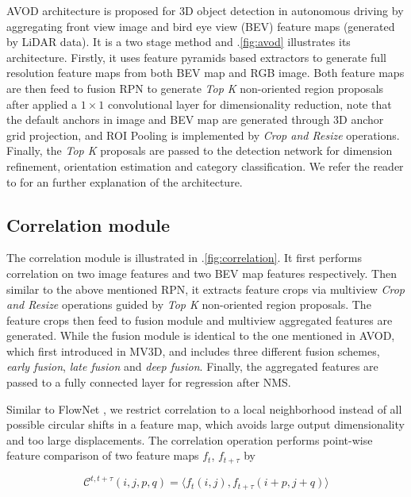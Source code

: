 \documentclass{bmvc2k}
\begin{document}
AVOD architecture is proposed for 3D object detection in autonomous driving by aggregating front view image and bird eye view (BEV) feature maps (generated by LiDAR data). It is a two stage method and \figurename .\ref{fig:avod} illustrates its architecture. Firstly, it uses feature pyramids based extractors to generate full resolution feature maps from both BEV map and RGB image. Both feature maps are then feed to fusion RPN to generate \textit{Top K} non-oriented region proposals after applied a $1 \times 1$ convolutional layer for dimensionality reduction, note that the default anchors in image and BEV map are generated through 3D anchor grid projection, and ROI Pooling is implemented by \textit{Crop and Resize} operations. Finally, the \textit{Top K} proposals are passed to the detection network for dimension refinement, orientation estimation and category classification. We refer
the reader to \cite{ku2018joint} for an further explanation of the architecture.

\subsection{Correlation module}
The correlation module is illustrated in \figurename .\ref{fig:correlation}. It first performs correlation on two image features and two BEV map features respectively. Then similar to the above mentioned RPN, it extracts feature crops via multiview \textit{Crop and Resize} operations guided by \textit{Top K} non-oriented region proposals. The feature crops then feed to fusion module and multiview aggregated features are generated. While the fusion module is identical to the one mentioned in AVOD, which first introduced in MV3D\cite{chen2017multi}, and includes three different fusion schemes, \textit{early fusion}, \textit{late fusion} and \textit{deep fusion}. Finally, the aggregated features are passed to a fully connected layer for regression after NMS.

Similar to FlowNet \cite{dosovitskiy2015flownet}, we restrict correlation to a local neighborhood instead of all possible circular shifts in a feature map, which avoids large output dimensionality and too large displacements. The correlation operation performs point-wise feature comparison of two feature maps $f_t$, $f_{t+\tau}$ by

\begin{equation}
\mathcal{C}^{t, t+\tau}(i, j, p, q) = \Big \langle f_t(i, j), f_{t+\tau} (i+p, j+q) \Big \rangle 
\end{equation}
\end{document}
